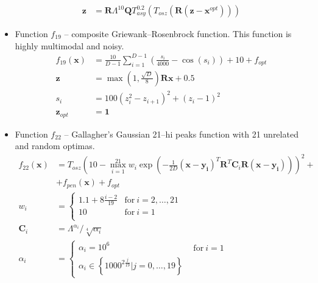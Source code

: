 \begin{itemize}
\begin{align*}
        \mathbf{z} &= \mathbf{R}\Lambda^{10}\mathbf{Q}T_{asy}^{0.2} \left( T_{osz}\left(\mathbf{R}\left(\mathbf{z}-\mathbf{x}^{opt}\right)\right) \right)
    \end{align*}
    \item Function $f_{19}$ -- composite Griewank--Rosenbrock function. This function is highly multimodal and noisy.
    \begin{align*}
        f_{19}\left(\mathbf{x}\right) &= \frac{10}{D-1}\sum_{i=1}^{D-1}\left( \frac{s_i}{4000} - \cos\left(s_i\right) \right) + 10 + f_{opt}\\
        \mathbf{z} &= \max\left(1,\frac{\sqrt{D}}{8}\right)\mathbf{R}\mathbf{x}+0.5 \\
        s_i &= 100 \left(z_i^2 - z_{i+1}\right)^2 + \left(z_i-1\right)^2 \\
        \mathbf{z}_{opt} &= \mathbf{1}
    \end{align*}
    \item Function $f_{22}$ -- Gallagher's Gaussian 21--hi peaks function with 21 unrelated and random optimas.
    \begin{align*}
        f_{22}\left(\mathbf{x}\right) &= T_{osz}\left( 
            10 - \max_{i=1}^{21} w_i \exp\left( -\frac{1}{2D}\left(\mathbf{x}-\mathbf{y_i}\right)^T\mathbf{R}^T\mathbf{C}_i\mathbf{R}\left(\mathbf{x}-\mathbf{y_i}\right) \right) 
        \right)^2 + \\
        & + f_{pen}(\mathbf{x}) + f_{opt} \\
        w_i &= \left\{
            \begin{array}{ll}
                1.1+8\frac{i-2}{19} & \text{for}\ i=2,\dots,21 \\
                10                  & \text{for}\ i=1 \\
            \end{array}
        \right.
        \\
        \mathbf{C}_i &= \Lambda^{\alpha_i} / \sqrt[4]{\alpha_i} \\
        \alpha_i &= \left\{ 
            \begin{array}{ll}
                \alpha_i = 10^6 & 
                    \begin{array}{l}
                        \text{for}\ i=1
                    \end{array} \\
                \alpha_i \in \left\{1000^{2\frac{j}{19}}|j=0,\dots,19\right\} &
                    \begin{array}{l}

\end{array}
\end{array}
\end{align*}
\end{itemize}
